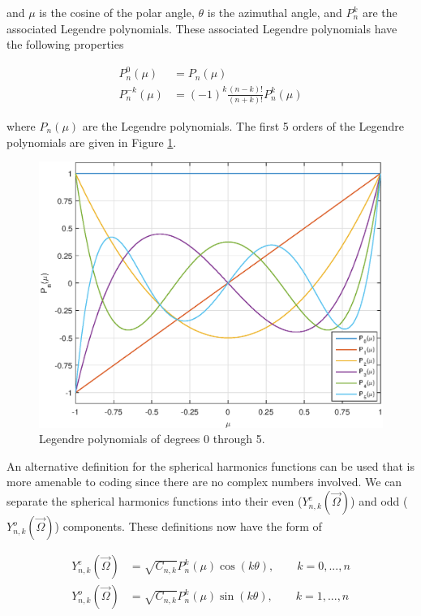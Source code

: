 \noindent and $\mu$ is the cosine of the polar angle, $\theta$ is the azimuthal angle, and $P_n^k$ are the associated Legendre polynomials. These associated Legendre polynomials have the following properties

\begin{equation}
\label{eq::App_SN_ass_leg_props}
\begin{aligned}
P_n^0 (\mu) &= P_n (\mu)  \\
P_n^{-k} (\mu) &= (-1)^k \frac{(n-k)!}{(n+k) !} P_n^{k} (\mu)
\end{aligned}
\end{equation}

\noindent where $P_n (\mu)$ are the Legendre polynomials. The first 5 orders of the Legendre polynomials are given in Figure \ref{fig::Legendre_Polynomials}. 

\begin{figure}
\centering
\includegraphics[width=\textwidth]{figures/appendices/LegPoly.eps}
\caption{Legendre polynomials of degrees 0 through 5.}
\label{fig::Legendre_Polynomials}
\end{figure}

An alternative definition for the spherical harmonics functions can be used that is more amenable to coding since there are no complex numbers involved. We can separate the spherical harmonics functions into their even ($Y_{n,k}^e  (\vec{\Omega}) $) and odd ($Y_{n,k}^o  (\vec{\Omega}) $) components. These definitions now have the form of 

\begin{equation}
\label{eq::App_SN_sharm_funcs}
\begin{aligned}
Y^e_{n,k} (\vec{\Omega}) &= \sqrt{C_{n,k}} P_n^k (\mu) \cos (k \theta), \qquad k=0,...,n  \\
Y^o_{n,k} (\vec{\Omega}) &= \sqrt{C_{n,k}} P_n^k (\mu) \sin (k \theta) , \qquad k=1,...,n
\end{aligned}
\end{equation}

